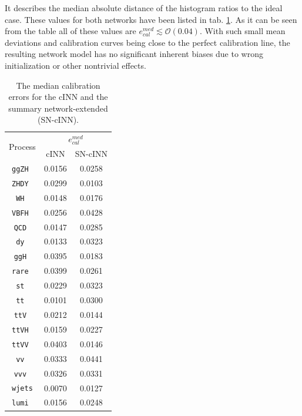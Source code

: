 It describes the median absolute distance of the histogram ratios to the ideal case. These values for both networks have been listed in tab. \ref{tab:ecal_med}. As it can be seen from the table all of these values are $e^{med}_{cal}\lesssim\mathcal{O}(0.04)$. With such small mean deviations and calibration curves being close to the perfect calibration line, the resulting network model has no significant inherent biases due to wrong initialization or other nontrivial effects.

\begin{table}[h!]
	\centering
	\begin{tabular}{ccc}
		\multirow{2}{*}{Process}& \multicolumn{2}{c}{$e^{med}_{cal}$} \\
		 & cINN & SN-cINN \\
		\hline
		\texttt{ggZH }   & 0.0156    &    0.0258  \\
		\texttt{ZHDY }   & 0.0299    &    0.0103  \\
		\texttt{WH   }   & 0.0148    &    0.0176  \\
		\texttt{VBFH }   & 0.0256    &    0.0428  \\
		\texttt{QCD  }   & 0.0147    &    0.0285  \\
		\texttt{dy   }   & 0.0133    &    0.0323  \\
		\texttt{ggH  }   & 0.0395    &    0.0183  \\
		\texttt{rare }   & 0.0399    &    0.0261  \\
		\texttt{st   }   & 0.0229    &    0.0323  \\
		\texttt{tt   }   & 0.0101    &    0.0300  \\
		\texttt{ttV  }   & 0.0212    &    0.0144  \\
		\texttt{ttVH }   & 0.0159    &    0.0227  \\
		\texttt{ttVV }   & 0.0403    &    0.0146  \\
		\texttt{vv   }   & 0.0333    &    0.0441  \\
		\texttt{vvv  }   & 0.0326    &    0.0331  \\
		\texttt{wjets}   & 0.0070    &    0.0127  \\
		\texttt{lumi }   & 0.0156    &    0.0248  \\
		\hline
	\end{tabular}
	\caption{The median calibration errors for the cINN and the summary network-extended (SN-cINN).}
	\label{tab:ecal_med}
\end{table}


